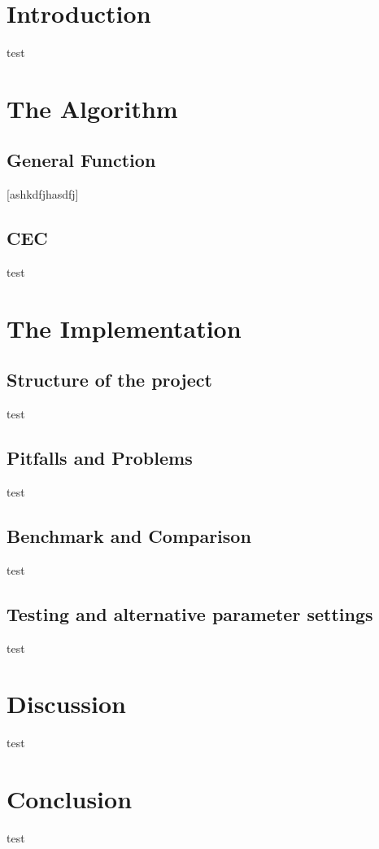 \section{Introduction}
\label{introduction}

test

\pagebreak 

\section{The Algorithm}
\label{thealgorithm}

\subsection{General Function}
\label{generalfunction}

[ashkdfjhasdfj]

\subsection{CEC}
\label{cec}

test

\pagebreak 

\section{The Implementation}
\label{theimplementation}

\subsection{Structure of the project}
\label{structureoftheproject}

test ~\citep{fieldsend_2014}

\subsection{Pitfalls and Problems}
\label{pitfallsandproblems}

test

\subsection{Benchmark and Comparison}
\label{benchmarkandcomparison}

test

\subsection{Testing and alternative parameter settings}
\label{testingandalternativeparametersettings}

test

\section{Discussion}
\label{discussion}

test

\section{Conclusion}
\label{conclusion}

test
